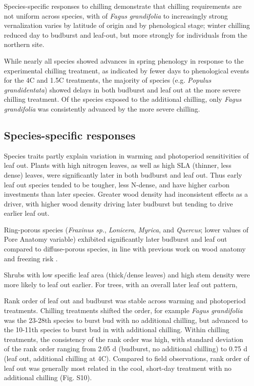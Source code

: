 \documentclass[11pt]{article}
\begin{document}
Species-specific responses to chilling demonstrate that chilling requirements are not uniform across species, with 
of \emph{Fagus grandifolia} to increasingly strong vernalization varies by latitude of origin and by phenological stage; winter chilling reduced day to budburst and leaf-out, but more strongly for individuals from the northern site.

While nearly all species showed advances in spring phenology in response to the experimental chilling treatment, as indicated by fewer days to phenological events for the 4\degree C and 1.5\degree C treatments, the majority of species (e.g. \emph{Populus grandidentata}) showed delays in both budburst and leaf out at the more severe chilling treatment. Of the species exposed to the additional chilling, only \emph{Fagus grandifolia} was consistently advanced by the more severe chilling.

\subsection*{Species-specific responses}

Species traits partly explain variation in warming and photoperiod sensitivities of leaf out. Plants with high nitrogen leaves, as well as high SLA (thinner, less dense) leaves, were significantly later in both budburst and leaf out. Thus early leaf out species tended to be tougher, less N-dense, and have higher carbon investments than later species. Greater wood density had inconsistent effects as a driver, with higher wood density driving later budburst but tending to drive earlier leaf out.

Ring-porous species (\emph{Fraxinus sp.}, \emph{Lonicera}, \emph{Myrica}, and \emph{Quercus}; lower values of Pore Anatomy variable) exhibited significantly later budburst and leaf out compared to diffuse-porous species, in line with previous work on wood anatomy and freezing risk \cite{Sperry:1992}.

Shrubs with low specific leaf area (thick/dense leaves) and high stem density were more likely to leaf out earlier. For trees, with an overall later leaf out pattern, 

Rank order of leaf out and budburst was stable across warming and photoperiod treatments. Chilling treatments shifted the order, for example \emph{Fagus grandifolia} was the 23-28th species to burst bud with no additional chilling, but advanced to the 10-11th species to burst bud in with additional chilling. Within chilling treatments, the consistency of the rank order was high, with standard deviation of the rank order ranging from 2.05 d (budburst, no additional chilling) to 0.75 d (leaf out, additional chilling at 4\degree C). Compared to field observations, rank order of leaf out was generally most related in the cool, short-day treatment with no additional chilling (Fig. S10).
\end{document}
